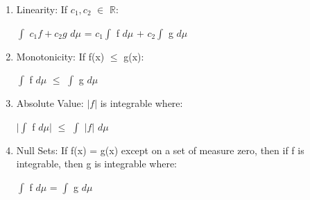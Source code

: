     \begin{enumerate}[label=(\alph*), leftmargin=2cm, itemsep=0.1cm]
        \item {\color{lblue} Linearity}:
            If $c_1,c_2$ $\in$ $\mathbb{R}$:

            \hspace{0.5cm}
            $\int$ $c_1f + c_2g$ $d\mu$
            = $c_1 \int$ f $d\mu$ + $c_2 \int$ g $d\mu$

        \item {\color{lblue} Monotonicity}:
            If f(x) $\leq$ g(x):

            \hspace{0.5cm}
            $\int$ f $d\mu$ $\leq$ $\int$ g $d\mu$

        \item {\color{lblue} Absolute Value}:
            $|f|$ is integrable where:

            \hspace{0.5cm}
            $|\int$ f $d\mu|$
            $\leq$ $\int$ $|f|$ $d\mu$

        \item {\color{lblue} Null Sets}:
            If f(x) = g(x) except on a set of measure zero,
            then if f is integrable, then g is integrable where:

            \hspace{0.5cm}
            $\int$ f $d\mu$ = $\int$ g $d\mu$
    \end{enumerate}